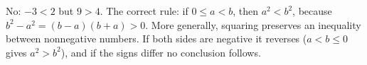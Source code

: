No: $-3<2$ but $9>4$. The correct rule: if $0\le a<b$, then $a^2<b^2$, because $b^2-a^2=(b-a)(b+a)>0$. More generally, squaring preserves an inequality between nonnegative numbers. If both sides are negative it reverses ($a<b\le0$ gives $a^2>b^2$), and if the signs differ no conclusion follows.
